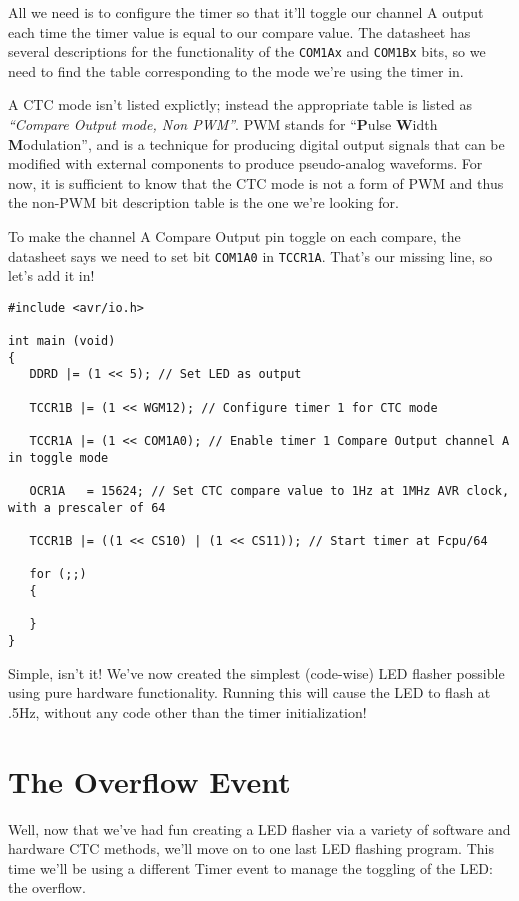 \documentclass[a4paper,oneside,notitlepage]{book}
\begin{document}
All we need is to configure the timer so that it'll toggle our channel A output each time the timer value is equal to our compare value. The datasheet has several descriptions for the functionality of the \texttt{COM1Ax} and \texttt{COM1Bx} bits, so we need to find the table corresponding to the mode we're using the timer in.

A CTC mode isn't listed explictly; instead the appropriate table is listed as \textit{``Compare Output mode, Non PWM''}. PWM stands for ``\textbf{P}ulse \textbf{W}idth \textbf{M}odulation'', and is a technique for producing digital output signals that can be modified with external components to produce pseudo-analog waveforms. For now, it is sufficient to know that the CTC mode is not a form of PWM and thus the non-PWM bit description table is the one we're looking for.

To make the channel A Compare Output pin toggle on each compare, the datasheet says we need to set bit \texttt{COM1A0} in \texttt{TCCR1A}. That's our missing line, so let's add it in!

\begin{center}
\begin{lstlisting}
#include <avr/io.h>

int main (void)
{
   DDRD |= (1 << 5); // Set LED as output

   TCCR1B |= (1 << WGM12); // Configure timer 1 for CTC mode

   TCCR1A |= (1 << COM1A0); // Enable timer 1 Compare Output channel A in toggle mode

   OCR1A   = 15624; // Set CTC compare value to 1Hz at 1MHz AVR clock, with a prescaler of 64

   TCCR1B |= ((1 << CS10) | (1 << CS11)); // Start timer at Fcpu/64

   for (;;)
   {

   }
}
\end{lstlisting}
\end{center}

Simple, isn't it! We've now created the simplest (code-wise) LED flasher possible using pure hardware functionality. Running this will cause the LED to flash at .5Hz, without any code other than the timer initialization!


\label{chp:Overflows}
\chapter{The Overflow Event}

Well, now that we've had fun creating a LED flasher via a variety of software and hardware CTC methods, we'll move on to one last LED flashing program. This time we'll be using a different Timer event to manage the toggling of the LED: the overflow.
\end{document}
